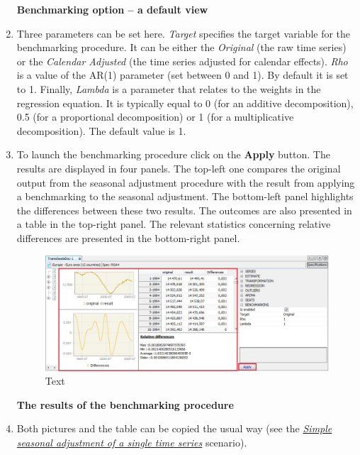 \documentclass[
  letterpaper,
  DIV=11,
  numbers=noendperiod]{scrreprt}
\begin{document}
\begin{enumerate}
  \textbf{Benchmarking option -- a default view}
\item
  Three parameters can be set here. \emph{Target} specifies the target
  variable for the benchmarking procedure. It can be either the
  \emph{Original} (the raw time series) or the \emph{Calendar Adjusted}
  (the time series adjusted for calendar effects). \emph{Rho} is a value
  of the AR(1) parameter (set between 0 and 1). By default it is set to
  1. Finally, \emph{Lambda} is a parameter that relates to the weights
  in the regression equation. It is typically equal to 0 (for an
  additive decomposition), 0.5 (for a proportional decomposition) or 1
  (for a multiplicative decomposition). The default value is 1.
\item
  To launch the benchmarking procedure click on the \textbf{Apply}
  button. The results are displayed in four panels. The top-left one
  compares the original output from the seasonal adjustment procedure
  with the result from applying a benchmarking to the seasonal
  adjustment. The bottom-left panel highlights the differences between
  these two results. The outcomes are also presented in a table in the
  top-right panel. The relevant statistics concerning relative
  differences are presented in the bottom-right panel.

  \begin{figure}

  {\centering \includegraphics{./All_images/UDimage2.jpg}

  }

  \caption{Text}

  \end{figure}

  \textbf{The results of the benchmarking procedure}
\item
  Both pictures and the table can be copied the usual way (see the
  \href{../case-studies/simplesa-single.html}{\emph{Simple seasonal
  adjustment of a single time series}} scenario).

  \begin{figure}


\end{figure}
\end{enumerate}
\end{document}

